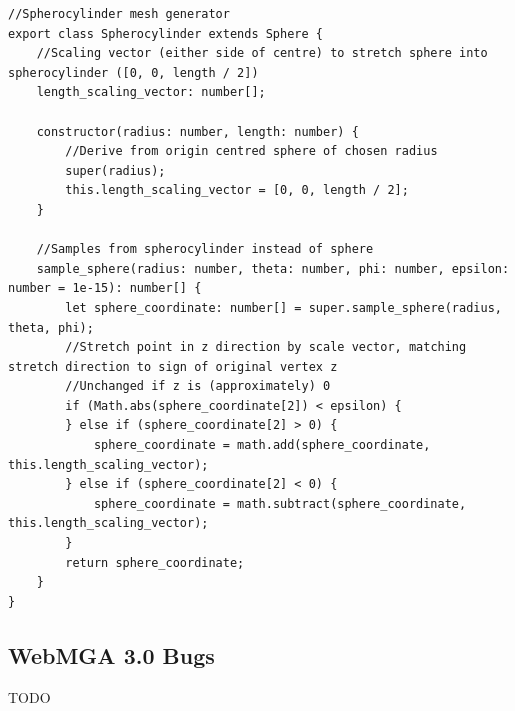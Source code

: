 \begin{adjustbox}{width=\textwidth}
\begin{lstlisting}
//Spherocylinder mesh generator
export class Spherocylinder extends Sphere {
    //Scaling vector (either side of centre) to stretch sphere into spherocylinder ([0, 0, length / 2])
    length_scaling_vector: number[];

    constructor(radius: number, length: number) {
        //Derive from origin centred sphere of chosen radius
        super(radius);
        this.length_scaling_vector = [0, 0, length / 2];
    }

    //Samples from spherocylinder instead of sphere
    sample_sphere(radius: number, theta: number, phi: number, epsilon: number = 1e-15): number[] {
        let sphere_coordinate: number[] = super.sample_sphere(radius, theta, phi);
        //Stretch point in z direction by scale vector, matching stretch direction to sign of original vertex z
        //Unchanged if z is (approximately) 0
        if (Math.abs(sphere_coordinate[2]) < epsilon) {
        } else if (sphere_coordinate[2] > 0) {
            sphere_coordinate = math.add(sphere_coordinate, this.length_scaling_vector);
        } else if (sphere_coordinate[2] < 0) {
            sphere_coordinate = math.subtract(sphere_coordinate, this.length_scaling_vector);
        }
        return sphere_coordinate;
    }
}
\end{lstlisting}
\end{adjustbox}

\subsection{WebMGA 3.0 Bugs}
TODO
